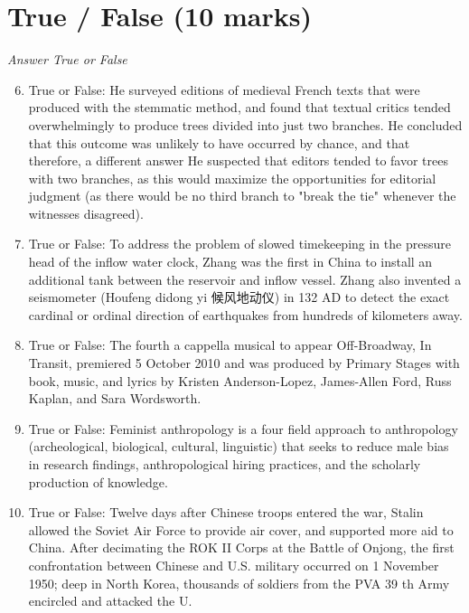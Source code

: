 \documentclass[12pt]{article}
\begin{document}
\section*{True / False (10 marks)}
\textit{Answer True or False}
\begin{enumerate}[label=\arabic*.]
\setcounter{enumi}{5}
\item True or False: He surveyed editions of medieval French texts that were produced with the stemmatic method, and found that textual critics tended overwhelmingly to produce trees divided into just two branches. He concluded that this outcome was unlikely to have occurred by chance, and that therefore, a different answer He suspected that editors tended to favor trees with two branches, as this would maximize the opportunities for editorial judgment (as there would be no third branch to "break the tie" whenever the witnesses disagreed).
\item True or False: To address the problem of slowed timekeeping in the pressure head of the inflow water clock, Zhang was the first in China to install an additional tank between the reservoir and inflow vessel. Zhang also invented a seismometer (Houfeng didong yi 候风地动仪) in 132 AD to detect the exact cardinal or ordinal direction of earthquakes from hundreds of kilometers away.
\item True or False: The fourth a cappella musical to appear Off-Broadway, In Transit, premiered 5 October 2010 and was produced by Primary Stages with book, music, and lyrics by Kristen Anderson-Lopez, James-Allen Ford, Russ Kaplan, and Sara Wordsworth.
\item True or False: Feminist anthropology is a four field approach to anthropology (archeological, biological, cultural, linguistic) that seeks to reduce male bias in research findings, anthropological hiring practices, and the scholarly production of knowledge.
\item True or False: Twelve days after Chinese troops entered the war, Stalin allowed the Soviet Air Force to provide air cover, and supported more aid to China. After decimating the ROK II Corps at the Battle of Onjong, the first confrontation between Chinese and U.S. military occurred on 1 November 1950; deep in North Korea, thousands of soldiers from the PVA 39 th Army encircled and attacked the U.
\end{enumerate}
\end{document}
